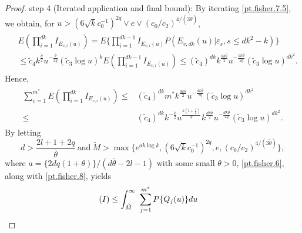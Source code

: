 \documentclass[ejsv2]{imsart}
\theoremstyle{plain}
\theoremstyle{definition}
\theoremstyle{remark}
\begin{document}
\begin{proof}
\vspace{0.3cm}
{\sc step 4 (Iterated application and final bound):}
By iterating \eqref{pt.fisher.7.5}, we obtain,
for $u{>} (6\sqrt{k}c_0^{-1})^{2q} \vee e \vee (c_0/c_2)^{4/(3\tilde{\theta})}$,
\begin{align*}
\begin{split}
&E(\prod_{i=1}^{dk}I_{E_{v,i}(u)})=
E\{\prod_{i=1}^{dk-1}I_{E_{v,i}(u)}P(E_{v,dk}(u)|\varepsilon_s,s\leq dk^2-k)\}\\
&\leq 
\tilde{c}_4{k^{\frac{\bar{\theta}}{2}}}u^{-\frac{\bar{\theta}}{2q}}({\tilde{c}_3}\log u)^k
E(\prod_{i=1}^{dk-1}I_{E_{v,i}(u)}) 
\leq 
(\tilde{c}_4)^{dk}{k^{\frac{dk\bar{\theta}}{2}}}u^{-\frac{dk\bar{\theta}}{2q}}({\tilde{c}_3}\log u)^{dk^2}.
\end{split}
\end{align*}
Hence,
\begin{align}\label{pt.fisher.8}
\begin{split}
   \sum_{v=1}^{m^\ast}
   E(\prod_{i=1}^{dk}I_{E_{v,i}(u)})
   \leq  & (\tilde{c}_4)^{dk}m^\ast {k^{\frac{dk\bar{\theta}}{2}}}u^{-\frac{dk\bar{\theta}}{2q}}({\tilde{c}_3}\log u)^{dk^2}\\
   \leq&  (\tilde{c}_4)^{dk}{k^{-\frac{k}{2}}}u^{\frac{k(l+\frac{1}{2})}{q}}{k^{\frac{dk\bar{\theta}}{2}}}u^{-\frac{dk\bar{\theta}}{2q}}({\tilde{c}_3}\log u)^{dk^2}.
\end{split}
\end{align}
By letting 
\begin{equation}\label{d tilde M}
d>\frac{2l+1+2q}{\bar{\theta}}\ \textrm{and}\ \tilde{M}>\max\{e^{ak\log k},(6\sqrt{k}c_0^{-1})^{2q},e,
(c_0/c_2)^{4/(3\tilde{\theta})}
\},
\end{equation}
where $a=\{2dq(1+\theta)\}/(d\bar{\theta}-2l-1)$ with some small $\theta>0$, 
\eqref{pt.fisher.6}, along with
\eqref{pt.fisher.8}, yields
\begin{align}\label{pt.fisher.9}
\begin{split}
&  {\rm (I)} \leq  \int_{\tilde{M}}^{\infty}\ \sum_{j=1}^{m^\ast}P\{Q_j(u)\} du

\end{split}
\end{align}
\end{proof}
\end{document}
